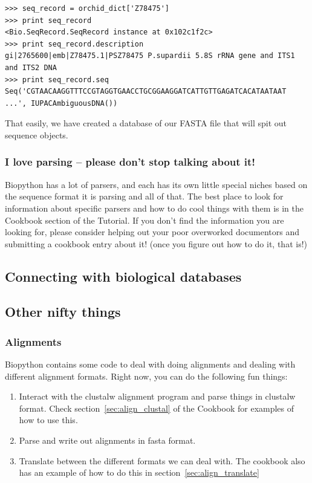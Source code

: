 \documentclass{article}
\begin{document}
\begin{verbatim}
>>> seq_record = orchid_dict['Z78475']
>>> print seq_record
<Bio.SeqRecord.SeqRecord instance at 0x102c1f2c>
>>> print seq_record.description
gi|2765600|emb|Z78475.1|PSZ78475 P.supardii 5.8S rRNA gene and ITS1 and ITS2 DNA
>>> print seq_record.seq
Seq('CGTAACAAGGTTTCCGTAGGTGAACCTGCGGAAGGATCATTGTTGAGATCACATAATAAT ...', IUPACAmbiguousDNA())
\end{verbatim}

That easily, we have created a database of our FASTA file that will spit out sequence objects. 


\subsubsection{I love parsing -- please don't stop talking about it!}

Biopython has a lot of parsers, and each has its own little special niches based on the sequence format it is parsing and all of that. The best place to look for information about specific parsers and how to do cool things with them is in the Cookbook section of the Tutorial. If you don't find the information you are looking for, please consider helping out your poor overworked documentors and submitting a cookbook entry about it! (once you figure out how to do it, that is!)


\subsection{Connecting with biological databases}

\subsection{Other nifty things}

\subsubsection{Alignments}

Biopython contains some code to deal with doing alignments and dealing with different alignment formats. Right now, you can do the following fun things:

\begin{enumerate}
\item Interact with the clustalw alignment program and parse things in clustalw format. Check section~\ref{sec:align_clustal} of the Cookbook for examples of how to use this.

\item Parse and write out alignments in fasta format. 

\item Translate between the different formats we can deal with. The cookbook also has an example of how to do this in section~\ref{sec:align_translate}
\end{enumerate}
\end{document}
